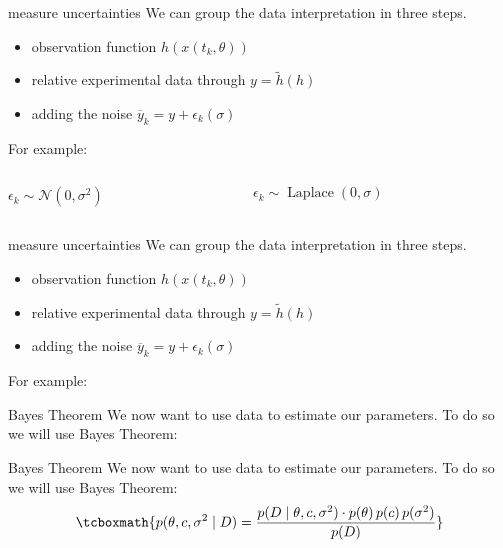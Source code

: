 \documentclass{beamer}
\newcommand{\s}{\sigma^2}
\begin{document}
  	\begin{frame}{measure uncertainties}
    	We can group the data interpretation in three steps.
    	\begin{itemize}
    		\item observation function $h(x(t_k,\theta))$
    		\item relative experimental data through $y = \tilde{h}(h)$
    		\item adding the noise $\overline{y}_{k} = y + \epsilon_{k}(\sigma)$
    	\end{itemize}
    	For example:
    	\vspace{0.7cm}
    	\begin{columns}
  			\begin{column}{3cm}
  				$\epsilon_{k} \sim \mathcal{N}(0,\s)$
  			\end{column}
  			\begin{column}{4cm}
 				$\epsilon_{k} \sim \operatorname{Laplace}(0,\sigma)$
  			\end{column}
  		\end{columns}
  	\end{frame}
  	
  	\begin{frame}{measure uncertainties}
    	We can group the data interpretation in three steps.
    	\begin{itemize}
    		\item observation function $h(x(t_k,\theta))$
    		\item relative experimental data through $y = \tilde{h}(h)$
    		\item adding the noise $\overline{y}_{k} = y + \epsilon_{k}(\sigma)$
    	\end{itemize}
    	For example:
    	\vspace{0.7cm}
  		\tcbox[colframe=red!75!black]
  		{$\epsilon_{k} \sim \mathcal{N}(0,\s)$}
  	\end{frame}
     
  	\begin{frame}{Bayes Theorem}
  		We now want to use data to estimate our parameters. To 
  		do so we will use Bayes Theorem: %
  	\end{frame}

	\begin{frame}{Bayes Theorem}
  		We now want to use data to estimate our parameters. To 
  		do so we will use Bayes Theorem:
  		\[  \tcboxmath{p(\theta,c,\s \mid D) = \frac{p(D \mid \theta,c,\s) \cdot
  		p(\theta) \, p(c) \, p(\s)}{p(D)}} \]
  	\end{frame}
  	
\end{document}
